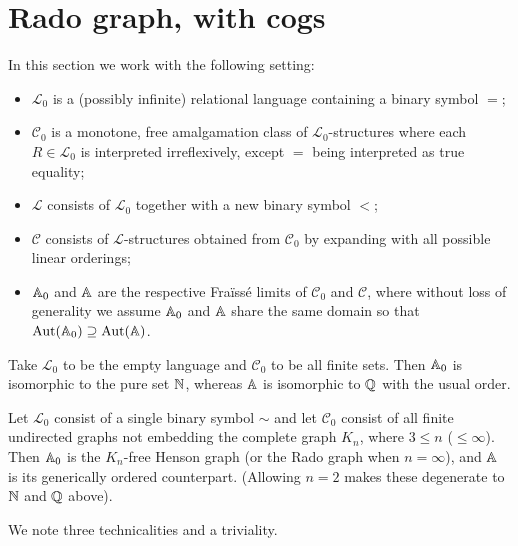 \section{Rado graph, with cogs}
In this section we work with the following setting:
\begin{itemize}
    \item 
    $\mathcal{L}_0$ is a (possibly infinite) relational language containing a binary symbol $=$;

    \item 
    $\mathcal{C}_0$ is a monotone, free amalgamation class of $\mathcal{L}_0$-structures 
    where each $R \in \mathcal{L}_0$ is interpreted irreflexively, except $=$ being interpreted as true equality;

    \item 
    $\mathcal{L}$ consists of $\mathcal{L}_0$ together with a new binary symbol $<$;

    \item 
    $\mathcal{C}$ consists of $\mathcal{L}$-structures obtained from $\mathcal{C}_0$ by expanding with all possible linear orderings;

    \item 
    $\mathbb{A}_0$ and $\mathbb{A}$ are the respective Fraïssé limits of $\mathcal{C}_0$ and $\mathcal{C}$,
    where without loss of generality we assume $\mathbb{A}_0$ and $\mathbb{A}$ share the same domain so that $\operatorname{Aut}(\mathbb{A}_0) \supseteq \operatorname{Aut}(\mathbb{A})$.
\end{itemize}

\begin{example}\label{ex:N-Q}
    Take $\mathcal{L}_0$ to be the empty language and $\mathcal{C}_0$ to be all finite sets.
    Then $\mathbb{A}_0$ is isomorphic to the pure set $\mathbb{N}$, whereas $\mathbb{A}$ is isomorphic to $\mathbb{Q}$ with the usual order.
\end{example}

\begin{example}\label{ex:Rado-orderedRado}
    Let $\mathcal{L}_0$ consist of a single binary symbol $\sim$ 
    and let $\mathcal{C}_0$ consist of all finite undirected graphs not embedding the complete graph $K_n$,
    where $3 \leq n$ ($\leq \infty$).
    Then $\mathbb{A}_0$ is the $K_n$-free Henson graph (or the Rado graph when $n = \infty$), and $\mathbb{A}$ is its generically ordered counterpart.
    (Allowing $n = 2$ makes these degenerate to $\mathbb{N}$ and $\mathbb{Q}$ above).
\end{example}

We note three technicalities and a triviality.

